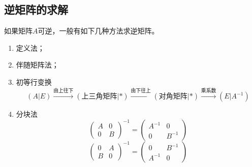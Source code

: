 \subsection{逆矩阵的求解}
如果矩阵$A$可逆，一般有如下几种方法求逆矩阵。
\begin{enumerate}[(1)]
    \item 定义法；
    \item 伴随矩阵法；
    \item 初等行变换
          \[ (A|E) \xrightarrow{\text{由上往下}} (\text{上三角矩阵}|*)\xrightarrow{\text{由下往上}} (\text{对角矩阵}|*)\xrightarrow{\text{乘系数}}(E|A^{-1}) \]
    \item 分块法
          \[
              \begin{pmatrix}
                  A & 0 \\
                  0 & B
              \end{pmatrix}^{-1}
              =
              \begin{pmatrix}
                  A^{-1} & 0      \\
                  0      & B^{-1}
              \end{pmatrix}
          \]
          \[
              \begin{pmatrix}
                  0 & A \\
                  B & 0
              \end{pmatrix}^{-1}
              =
              \begin{pmatrix}
                  0      & B^{-1} \\
                  A^{-1} & 0
              \end{pmatrix}
          \]
\end{enumerate}

